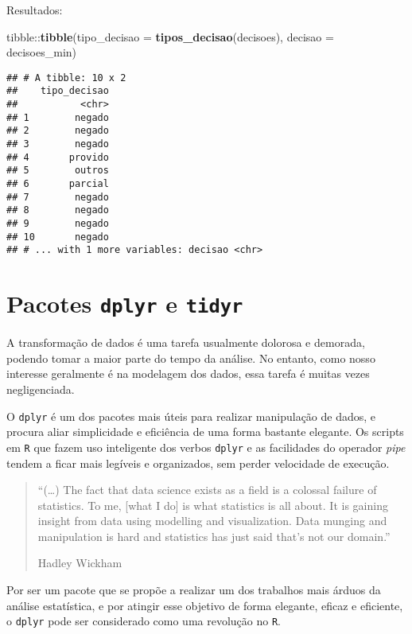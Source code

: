 \documentclass[]{book}
\newenvironment{Shaded}{\begin{snugshade}}{\end{snugshade}}
\newcommand{\KeywordTok}[1]{\textcolor[rgb]{0.13,0.29,0.53}{\textbf{{#1}}}}
\newcommand{\DataTypeTok}[1]{\textcolor[rgb]{0.13,0.29,0.53}{{#1}}}
\newcommand{\NormalTok}[1]{{#1}}
\begin{document}
Resultados:

\begin{Shaded}
\begin{Highlighting}[]
\NormalTok{tibble::}\KeywordTok{tibble}\NormalTok{(}\DataTypeTok{tipo_decisao =} \KeywordTok{tipos_decisao}\NormalTok{(decisoes), }\DataTypeTok{decisao =} \NormalTok{decisoes_min)}
\end{Highlighting}
\end{Shaded}

\begin{verbatim}
## # A tibble: 10 x 2
##    tipo_decisao
##           <chr>
## 1        negado
## 2        negado
## 3        negado
## 4       provido
## 5        outros
## 6       parcial
## 7        negado
## 8        negado
## 9        negado
## 10       negado
## # ... with 1 more variables: decisao <chr>
\end{verbatim}

\section{\texorpdfstring{Pacotes \texttt{dplyr} e
\texttt{tidyr}}{Pacotes dplyr e tidyr}}\label{pacotes-dplyr-e-tidyr}

A transformação de dados é uma tarefa usualmente dolorosa e demorada,
podendo tomar a maior parte do tempo da análise. No entanto, como nosso
interesse geralmente é na modelagem dos dados, essa tarefa é muitas
vezes negligenciada.

O \texttt{dplyr} é um dos pacotes mais úteis para realizar manipulação
de dados, e procura aliar simplicidade e eficiência de uma forma
bastante elegante. Os scripts em \texttt{R} que fazem uso inteligente
dos verbos \texttt{dplyr} e as facilidades do operador \emph{pipe}
tendem a ficar mais legíveis e organizados, sem perder velocidade de
execução.

\begin{quote}
``(\ldots{}) The fact that data science exists as a field is a colossal
failure of statistics. To me, {[}what I do{]} is what statistics is all
about. It is gaining insight from data using modelling and
visualization. Data munging and manipulation is hard and statistics has
just said that's not our domain.''

Hadley Wickham
\end{quote}

Por ser um pacote que se propõe a realizar um dos trabalhos mais árduos
da análise estatística, e por atingir esse objetivo de forma elegante,
eficaz e eficiente, o \texttt{dplyr} pode ser considerado como uma
revolução no \texttt{R}.
\end{document}
